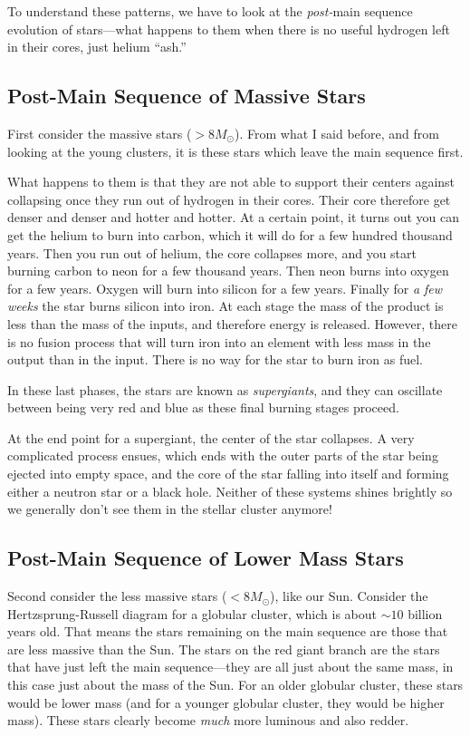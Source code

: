 \documentclass[12pt, preprint]{aastex}
\begin{document}
To understand these patterns, we have to look at the {\it post-}main
sequence evolution of stars---what happens to them when there is no
useful hydrogen left in their cores, just helium ``ash.''

\subsection{Post-Main Sequence of Massive Stars}

First consider the massive stars ($>8M_\odot$). From what I said
before, and from looking at the young clusters, it is these stars
which leave the main sequence first.

What happens to them is that they are not able to support their
centers against collapsing once they run out of hydrogen in their
cores. Their core therefore get denser and denser and hotter and
hotter. At a certain point, it turns out you can get the helium to
burn into carbon, which it will do for a few hundred thousand years.
Then you run out of helium, the core collapses more, and you start
burning carbon to neon for a few thousand years. Then neon burns into
oxygen for a few years. Oxygen will burn into silicon for a few
years. Finally for {\it a few weeks} the star burns silicon into
iron. At each stage the mass of the product is less than the mass of
the inputs, and therefore energy is released. However, there is no
fusion process that will turn iron into an element with less mass in
the output than in the input. There is no way for the star to burn
iron as fuel.

In these last phases, the stars are known as {\it supergiants}, and
they can oscillate between being very red and blue as these final
burning stages proceed.

At the end point for a supergiant, the center of the star collapses. A
very complicated process ensues, which ends with the outer parts of
the star being ejected into empty space, and the core of the star
falling into itself and forming either a neutron star or a black
hole. Neither of these systems shines brightly so we generally don't
see them in the stellar cluster anymore!

\subsection{Post-Main Sequence of Lower Mass Stars}

Second consider the less massive stars ($<8 M_\odot$), like our Sun.
Consider the Hertzsprung-Russell diagram for a globular cluster, which
is about $\sim 10$ billion years old. That means the stars remaining
on the main sequence are those that are less massive than the Sun. The
stars on the red giant branch are the stars that have just left the
main sequence---they are all just about the same mass, in this case
just about the mass of the Sun. For an older globular cluster, these
stars would be lower mass (and for a younger globular cluster, they
would be higher mass). These stars clearly become {\it much} more
luminous and also redder.
\end{document}
